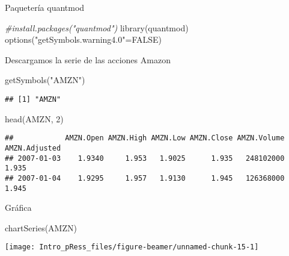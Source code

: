 \documentclass[
  10,
  ignorenonframetext,
]{beamer}
\newenvironment{Shaded}{\begin{snugshade}}{\end{snugshade}}
\newcommand{\CommentTok}[1]{\textcolor[rgb]{0.56,0.35,0.01}{\textit{#1}}}
\newcommand{\ConstantTok}[1]{\textcolor[rgb]{0.00,0.00,0.00}{#1}}
\newcommand{\DecValTok}[1]{\textcolor[rgb]{0.00,0.00,0.81}{#1}}
\newcommand{\FunctionTok}[1]{\textcolor[rgb]{0.00,0.00,0.00}{#1}}
\newcommand{\NormalTok}[1]{#1}
\newcommand{\OtherTok}[1]{\textcolor[rgb]{0.56,0.35,0.01}{#1}}
\newcommand{\StringTok}[1]{\textcolor[rgb]{0.31,0.60,0.02}{#1}}
\begin{document}
\begin{frame}[fragile]{Paquetería quantmod}
\protect\hypertarget{paqueteruxeda-quantmod}{}
\begin{Shaded}
\begin{Highlighting}[]
\CommentTok{\#install.packages("quantmod")}
\FunctionTok{library}\NormalTok{(quantmod)}
\FunctionTok{options}\NormalTok{(}\StringTok{"getSymbols.warning4.0"}\OtherTok{=}\ConstantTok{FALSE}\NormalTok{)}
\end{Highlighting}
\end{Shaded}

Descargamos la serie de las acciones Amazon

\begin{Shaded}
\begin{Highlighting}[]
\FunctionTok{getSymbols}\NormalTok{(}\StringTok{"AMZN"}\NormalTok{)}
\end{Highlighting}
\end{Shaded}

\begin{verbatim}
## [1] "AMZN"
\end{verbatim}

\begin{Shaded}
\begin{Highlighting}[]
\FunctionTok{head}\NormalTok{(AMZN, }\DecValTok{2}\NormalTok{)}
\end{Highlighting}
\end{Shaded}

\begin{verbatim}
##            AMZN.Open AMZN.High AMZN.Low AMZN.Close AMZN.Volume AMZN.Adjusted
## 2007-01-03    1.9340     1.953   1.9025      1.935   248102000         1.935
## 2007-01-04    1.9295     1.957   1.9130      1.945   126368000         1.945
\end{verbatim}
\end{frame}

\begin{frame}[fragile]{Gráfica}
\protect\hypertarget{gruxe1fica}{}
\begin{Shaded}
\begin{Highlighting}[]
\FunctionTok{chartSeries}\NormalTok{(AMZN)}
\end{Highlighting}
\end{Shaded}

\begin{center}\texttt{[image: Intro\_pRess\_files/figure-beamer/unnamed-chunk-15-1]} \end{center}
\end{frame}
\end{document}
